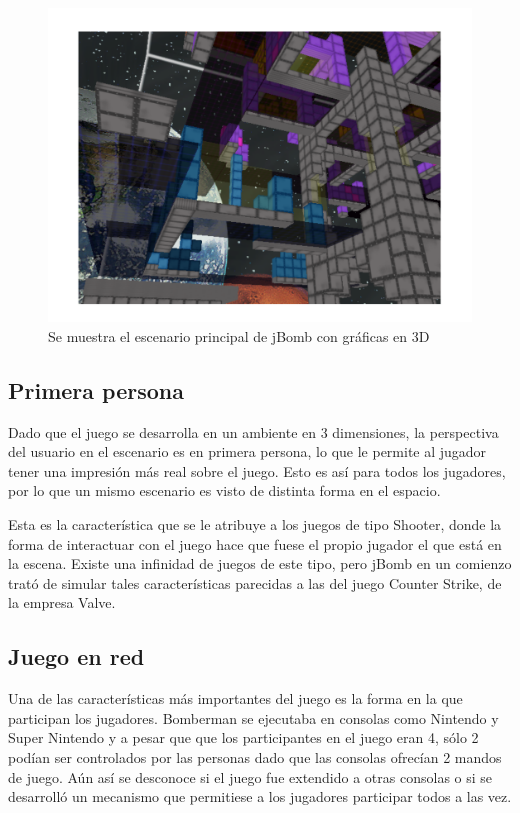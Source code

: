 \documentclass[a4paper,12pt,openany,oneside]{book}
\begin{document}
\begin{figure}
\begin{center}
\includegraphics[scale=.7]{tri.pdf}
\end{center}
\caption[Imágen de escenario 3D en jBomb]{Se muestra el escenario principal de jBomb con gráficas en 3D}
\label{trilabel}
\end{figure}
\subsection{Primera persona}
Dado que el juego se desarrolla en un ambiente en 3 dimensiones, la perspectiva del usuario en el escenario es en primera persona, lo que le permite al jugador tener una impresión más real sobre el juego. Esto es así para todos los jugadores, por lo que un mismo escenario es visto de distinta forma en el espacio.

Esta es la característica que se le atribuye a los juegos de tipo Shooter, donde la forma de interactuar con el juego hace que fuese el propio jugador el que está en la escena. Existe una infinidad de juegos de este tipo, pero jBomb en un comienzo trató de simular tales características parecidas a las del juego Counter Strike, de la empresa Valve.
\subsection{Juego en red}
Una de las características más importantes del juego es la forma en la que participan los jugadores. Bomberman se ejecutaba en consolas como Nintendo y Super Nintendo y a pesar que que los participantes en el juego eran 4, sólo 2 podían ser controlados por las personas dado que las consolas ofrecían 2 mandos de juego. Aún así se desconoce si el juego fue extendido a otras consolas o si se desarrolló un mecanismo que permitiese a los jugadores participar todos a las vez.
\end{document}
